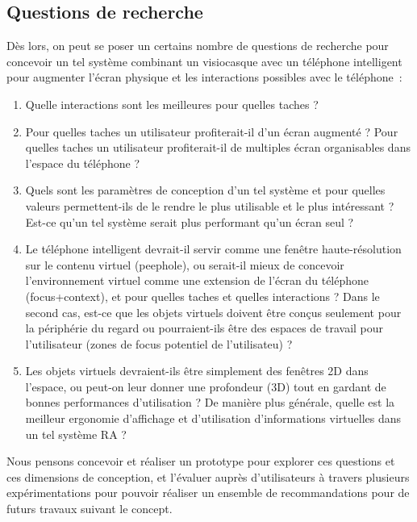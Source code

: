\subsection*{Questions de recherche}
Dès lors, on peut se poser un certains nombre de questions de recherche pour concevoir un tel système combinant un visiocasque avec un téléphone intelligent pour augmenter l'écran physique et les interactions possibles avec le téléphone~:
\begin{enumerate}
	\item Quelle interactions sont les meilleures pour quelles taches ?
	\item Pour quelles taches un utilisateur profiterait-il d'un écran augmenté ? Pour quelles taches un utilisateur profiterait-il de multiples écran organisables dans l'espace du téléphone ?
	\item Quels sont les paramètres de conception d'un tel système et pour quelles valeurs permettent-ils de le rendre le plus utilisable et le plus intéressant ? Est-ce qu'un tel système serait plus performant qu'un écran seul ?
	\item Le téléphone intelligent devrait-il servir comme une fenêtre haute-résolution sur le contenu virtuel (\foreignlanguage{english}{peephole}), ou serait-il mieux de concevoir l'environnement virtuel comme une extension de l'écran du téléphone (focus+context), et pour quelles taches et quelles interactions ? Dans le second cas, est-ce que les objets virtuels doivent être conçus seulement pour la périphérie du regard ou pourraient-ils être des espaces de travail pour l'utilisateur (zones de focus potentiel de l'utilisateu) ?
	\item Les objets virtuels devraient-ils être simplement des fenêtres 2D dans l'espace, ou peut-on leur donner une profondeur (3D) tout en gardant de bonnes performances d'utilisation ? De manière plus générale, quelle est la meilleur ergonomie d'affichage et d'utilisation d'informations virtuelles dans un tel système RA ?
\end{enumerate}

Nous pensons concevoir et réaliser un prototype pour explorer ces questions et ces dimensions de conception, et l'évaluer auprès d'utilisateurs à travers plusieurs expérimentations pour pouvoir réaliser un ensemble de recommandations pour de futurs travaux suivant le concept.




